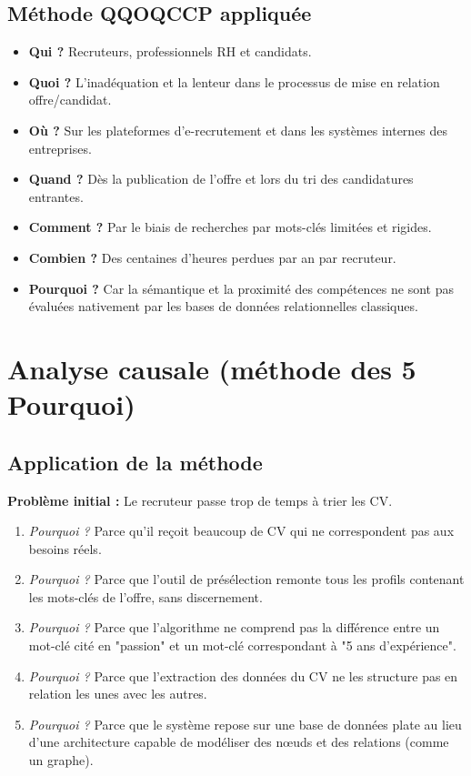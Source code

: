 \documentclass[12pt,a4paper]{report}
\begin{document}
\subsection{Méthode QQOQCCP appliquée}
\begin{itemize}
    \item \textbf{Qui ?} Recruteurs, professionnels RH et candidats.
    \item \textbf{Quoi ?} L'inadéquation et la lenteur dans le processus de mise en relation offre/candidat.
    \item \textbf{Où ?} Sur les plateformes d'e-recrutement et dans les systèmes internes des entreprises.
    \item \textbf{Quand ?} Dès la publication de l'offre et lors du tri des candidatures entrantes.
    \item \textbf{Comment ?} Par le biais de recherches par mots-clés limitées et rigides.
    \item \textbf{Combien ?} Des centaines d'heures perdues par an par recruteur.
    \item \textbf{Pourquoi ?} Car la sémantique et la proximité des compétences ne sont pas évaluées nativement par les bases de données relationnelles classiques.
\end{itemize}

\section{Analyse causale (méthode des 5 Pourquoi)}

\subsection{Application de la méthode}
\textbf{Problème initial :} Le recruteur passe trop de temps à trier les CV.
\begin{enumerate}
    \item \textit{Pourquoi ?} Parce qu'il reçoit beaucoup de CV qui ne correspondent pas aux besoins réels.
    \item \textit{Pourquoi ?} Parce que l'outil de présélection remonte tous les profils contenant les mots-clés de l'offre, sans discernement.
    \item \textit{Pourquoi ?} Parce que l'algorithme ne comprend pas la différence entre un mot-clé cité en "passion" et un mot-clé correspondant à "5 ans d'expérience".
    \item \textit{Pourquoi ?} Parce que l'extraction des données du CV ne les structure pas en relation les unes avec les autres.
    \item \textit{Pourquoi ?} Parce que le système repose sur une base de données plate au lieu d'une architecture capable de modéliser des nœuds et des relations (comme un graphe).
\end{enumerate}
\end{document}
